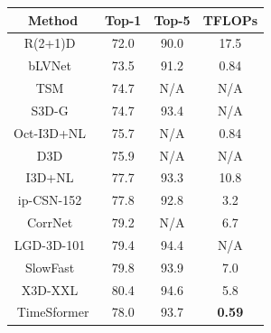 \documentclass{article}
\begin{document}
 
 \begin{table}
\footnotesize
\setlength{\tabcolsep}{3pt}
\scriptsize
\begin{center}
 \begin{tabular}{c c c c }
 \hline
 {Method} & {Top-1} & {Top-5} & {TFLOPs} \\ 
 \hline
R(2+1)D~\cite{DBLP:journals/corr/abs-1711-11248} & 72.0 & 90.0 & 17.5\\
bLVNet~\cite{NEURIPS2019_3d779cae} & 73.5 & 91.2 & 0.84\\
TSM~\cite{lin2019tsm} &74.7 & N/A & N/A\\
S3D-G~\cite{DBLP:conf/eccv/XieSHTM18} & 74.7 & 93.4 & N/A \\
Oct-I3D+NL~\cite{Chen_2019_ICCV} & 75.7 & N/A & 0.84\\
D3D~\cite{Stroud_2020_WACV} & 75.9 & N/A & N/A \\
I3D+NL~\cite{NLN} & 77.7 & 93.3 & 10.8 \\
ip-CSN-152~\cite{tran2019video} & 77.8 & 92.8 & 3.2 \\ 
CorrNet~\cite{Wang_2020_CVPR} & 79.2 & N/A & 6.7 \\
LGD-3D-101~\cite{qiu2019learning} & 79.4 & 94.4 & N/A\\ 
SlowFast~\cite{slowfast} & 79.8 & 93.9 & 7.0 \\
X3D-XXL~\cite{feichtenhofer2020x3d} &80.4 & 94.6 & 5.8 \\
\hline
   TimeSformer & 78.0 & 93.7 & \bf 0.59 \\

\end{tabular}
\end{center}
\end{table}
\end{document}
